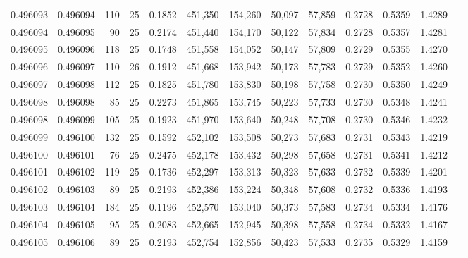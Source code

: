 \begin{tabular}{rrrrrrrrrrrrr}
0.496093 & 0.496094 &   110 &  25 &                                     0.1852 & 451,350 & 154,260 &  50,097 &  57,859 & 0.2728 & 0.5359 & 1.4289 \\
0.496094 & 0.496095 &    90 &  25 &                                     0.2174 & 451,440 & 154,170 &  50,122 &  57,834 & 0.2728 & 0.5357 & 1.4281 \\
0.496095 & 0.496096 &   118 &  25 &                                     0.1748 & 451,558 & 154,052 &  50,147 &  57,809 & 0.2729 & 0.5355 & 1.4270 \\
0.496096 & 0.496097 &   110 &  26 &                                     0.1912 & 451,668 & 153,942 &  50,173 &  57,783 & 0.2729 & 0.5352 & 1.4260 \\
0.496097 & 0.496098 &   112 &  25 &                                     0.1825 & 451,780 & 153,830 &  50,198 &  57,758 & 0.2730 & 0.5350 & 1.4249 \\
0.496098 & 0.496098 &    85 &  25 &                                     0.2273 & 451,865 & 153,745 &  50,223 &  57,733 & 0.2730 & 0.5348 & 1.4241 \\
0.496098 & 0.496099 &   105 &  25 &                                     0.1923 & 451,970 & 153,640 &  50,248 &  57,708 & 0.2730 & 0.5346 & 1.4232 \\
0.496099 & 0.496100 &   132 &  25 &                                     0.1592 & 452,102 & 153,508 &  50,273 &  57,683 & 0.2731 & 0.5343 & 1.4219 \\
0.496100 & 0.496101 &    76 &  25 &                                     0.2475 & 452,178 & 153,432 &  50,298 &  57,658 & 0.2731 & 0.5341 & 1.4212 \\
0.496101 & 0.496102 &   119 &  25 &                                     0.1736 & 452,297 & 153,313 &  50,323 &  57,633 & 0.2732 & 0.5339 & 1.4201 \\
0.496102 & 0.496103 &    89 &  25 &                                     0.2193 & 452,386 & 153,224 &  50,348 &  57,608 & 0.2732 & 0.5336 & 1.4193 \\
0.496103 & 0.496104 &   184 &  25 &                                     0.1196 & 452,570 & 153,040 &  50,373 &  57,583 & 0.2734 & 0.5334 & 1.4176 \\
0.496104 & 0.496105 &    95 &  25 &                                     0.2083 & 452,665 & 152,945 &  50,398 &  57,558 & 0.2734 & 0.5332 & 1.4167 \\
0.496105 & 0.496106 &    89 &  25 &                                     0.2193 & 452,754 & 152,856 &  50,423 &  57,533 & 0.2735 & 0.5329 & 1.4159 \\

\end{tabular}
